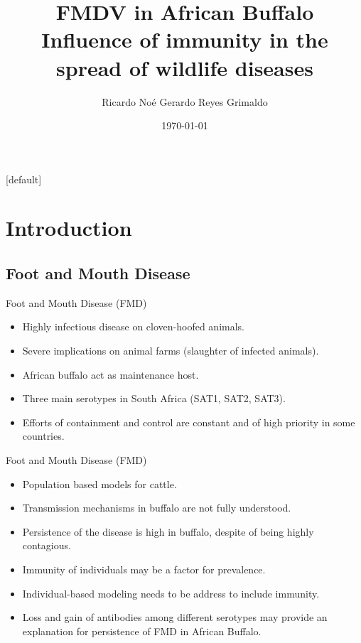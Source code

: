 \documentclass[10pt]{beamer}
\title[FMDV in African Buffalo]{FMDV in African Buffalo\\Influence of immunity in the spread 
of wildlife diseases}
\author[Ricardo Reyes]{Ricardo No\'e Gerardo Reyes Grimaldo}
\institute[OSU]{Oregon State University\\ 
\texttt{[image: OSU\_horizontal\_1C\_B]}}
\date{\today}
\makeatletter
\theoremstyle{plain}
\theoremstyle{definition}
\theoremstyle{remark}
\newenvironment{withoutheadline}{
        \setbeamertemplate{headline}[default]
        \def\beamer@entrycode{\vspace*{-\headheight}}
    }{}
\makeatother
\begin{document}
\begin{withoutheadline}
\begin{frame}
\titlepage
\end{frame}
\end{withoutheadline}


\section{Introduction}
\subsection{Foot and Mouth Disease}

\begin{frame}{Foot and Mouth Disease (FMD)}
\begin{itemize}
\item Highly infectious disease on cloven-hoofed animals.
\item Severe implications on animal farms (slaughter of infected animals).
\item African buffalo act as maintenance host.
\item Three main serotypes in South Africa (SAT1, SAT2, SAT3).
\item Efforts of containment and control are constant and of high priority in some countries.
\end{itemize}
\end{frame}


\begin{frame}{Foot and Mouth Disease (FMD)}
\begin{itemize}
\item Population based models for cattle.
\item Transmission mechanisms in buffalo are not fully understood.
\item Persistence of the disease is high in buffalo, despite of being highly contagious.
\item Immunity of individuals may be a factor for prevalence.
\item Individual-based modeling needs to be address to include immunity.
\item Loss and gain of antibodies among different serotypes may provide an explanation for 
persistence of FMD in African Buffalo.
\end{itemize}
\end{frame}
\end{document}
